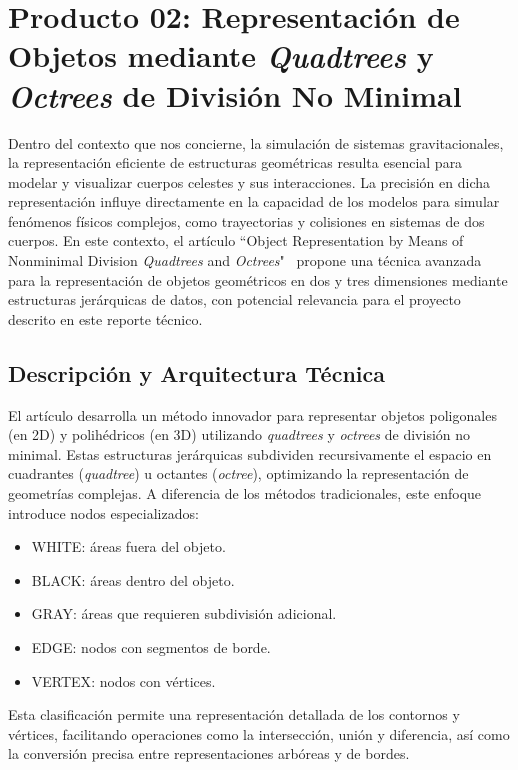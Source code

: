 \section[Producto 02: Representación de Objetos]{Producto 02: Representación de Objetos mediante \textit{Quadtrees} y \textit{Octrees} de División No Minimal}\label{sec:object_representation}

Dentro del contexto que nos concierne, la simulación de sistemas gravitacionales, la representación eficiente de estructuras geométricas resulta esencial para modelar y visualizar cuerpos celestes y sus interacciones. La precisión en dicha representación influye directamente en la capacidad de los modelos para simular fenómenos físicos complejos, como trayectorias y colisiones en sistemas de dos cuerpos. En este contexto, el artículo ``Object Representation by Means of Nonminimal Division \textit{Quadtrees} and \textit{Octrees}"~\cite{Ayala1985} propone una técnica avanzada para la representación de objetos geométricos en dos y tres dimensiones mediante estructuras jerárquicas de datos, con potencial relevancia para el proyecto descrito en este reporte técnico.

\subsection{Descripción y Arquitectura Técnica}

El artículo desarrolla un método innovador para representar objetos poligonales (en 2D) y polihédricos (en 3D) utilizando \textit{quadtrees} y \textit{octrees} de división no minimal. Estas estructuras jerárquicas subdividen recursivamente el espacio en cuadrantes (\textit{quadtree}) u octantes (\textit{octree}), optimizando la representación de geometrías complejas. A diferencia de los métodos tradicionales, este enfoque introduce nodos especializados: 
\begin{itemize}
    \item \textsc{WHITE}: áreas fuera del objeto. 
    \item \textsc{BLACK}: áreas dentro del objeto.
    \item \textsc{GRAY}: áreas que requieren subdivisión adicional. 
    \item \textsc{EDGE}: nodos con segmentos de borde.
    \item \textsc{VERTEX}: nodos con vértices. 
\end{itemize}
Esta clasificación permite una representación detallada de los contornos y vértices, facilitando operaciones como la intersección, unión y diferencia, así como la conversión precisa entre representaciones arbóreas y de bordes.

